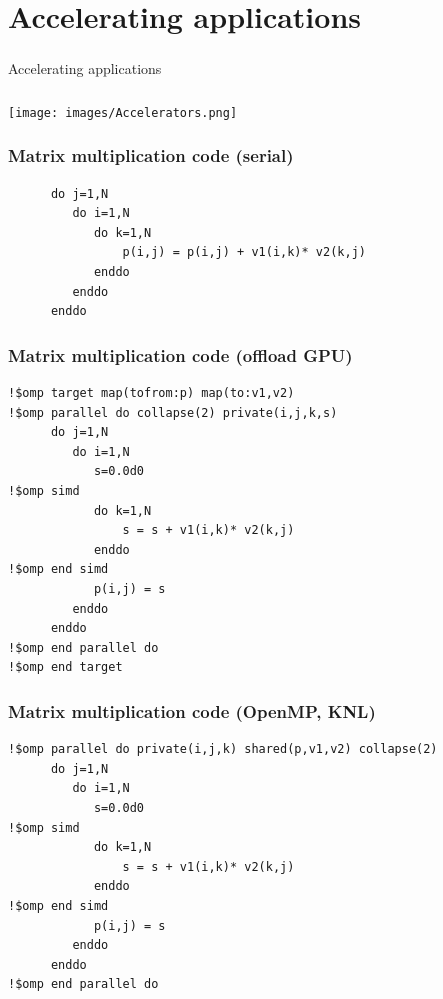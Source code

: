 \section{Accelerating applications}

\begin{frame}
	\frametitle{}
\begin{center}
{\Huge Accelerating applications}
\end{center}
\end{frame}

\begin{frame}
	\frametitle{}
\texttt{[image: images/Accelerators.png]}
\end{frame}

\begin{frame}[fragile]
	\frametitle{Matrix multiplication code (serial)}
{\small 
        \begin{verbatim}             
      do j=1,N
         do i=1,N
            do k=1,N
                p(i,j) = p(i,j) + v1(i,k)* v2(k,j)
            enddo
         enddo
      enddo
        \end{verbatim}
}
\end{frame}


\begin{frame}[fragile]
	\frametitle{Matrix multiplication code (offload GPU)}
{\small 
        \begin{verbatim}             
!$omp target map(tofrom:p) map(to:v1,v2)
!$omp parallel do collapse(2) private(i,j,k,s)
      do j=1,N
         do i=1,N
            s=0.0d0
!$omp simd 
            do k=1,N
                s = s + v1(i,k)* v2(k,j)
            enddo
!$omp end simd
            p(i,j) = s
         enddo
      enddo
!$omp end parallel do
!$omp end target
        \end{verbatim}
}
\end{frame}

\begin{frame}[fragile]
	\frametitle{Matrix multiplication code (OpenMP, KNL)}
{\small 
        \begin{verbatim}             
!$omp parallel do private(i,j,k) shared(p,v1,v2) collapse(2)
      do j=1,N
         do i=1,N
            s=0.0d0
!$omp simd 
            do k=1,N
                s = s + v1(i,k)* v2(k,j)
            enddo
!$omp end simd
            p(i,j) = s
         enddo
      enddo
!$omp end parallel do
        \end{verbatim}
}
\end{frame}



